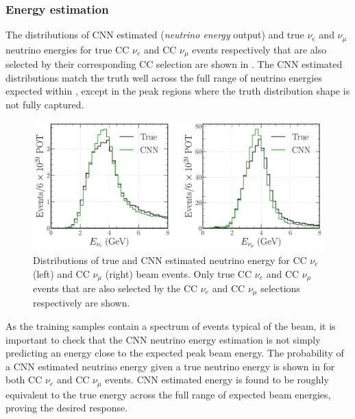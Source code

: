 \subsubsection*{Energy estimation} %

The distributions of CNN estimated (\emph{neutrino energy} output) and true $\nu_{e}$ and
$\nu_{\mu}$ neutrino energies for true CC $\nu_{e}$ and CC $\nu_{\mu}$ events respectively that
are also selected by their corresponding CC selection are shown in
. The CNN estimated distributions match the truth well across
the full range of neutrino energies expected within \chipsfive, except in the peak regions where
the truth distribution shape is not fully captured.

\begin{figure} %
    \includegraphics[width=\textwidth]{diagrams/7-results/final_energy_dists.pdf}
    \caption[Distributions of true and CNN estimated neutrino energy]
    {Distributions of true and CNN estimated neutrino energy for CC $\nu_{e}$ (left) and CC
        $\nu_{\mu}$ (right) beam events. Only true CC $\nu_{e}$ and CC $\nu_{\mu}$ events that are
        also selected by the CC $\nu_{e}$ and CC $\nu_{\mu}$ selections respectively are shown.}
    \label{fig:final_energy_dists}
\end{figure}

As the training samples contain a spectrum of events typical of the beam, it is important to check
that the CNN neutrino energy estimation is not simply predicting an energy close to the expected
peak beam energy. The probability of a CNN estimated neutrino energy given a true neutrino energy
is shown in  for both CC $\nu_{e}$ and CC $\nu_{\mu}$ events. CNN
estimated energy is found to be roughly equivalent to the true energy across the full range of
expected \chipsfive beam energies, proving the desired response.

